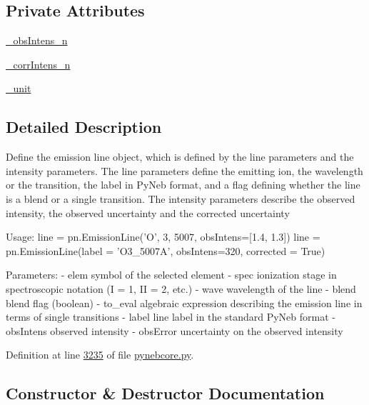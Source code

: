 \subsection*{Private Attributes}
\begin{DoxyCompactItemize}
\item 
\hyperlink{classpyneb_1_1core_1_1pynebcore_1_1_emission_line_a87753879f7fa6ac6a40e05bc0e5c3c72}{\+\_\+obs\+Intens\+\_\+n}
\item 
\hyperlink{classpyneb_1_1core_1_1pynebcore_1_1_emission_line_aa1f44ce8f6be439b590589c08da84fc2}{\+\_\+corr\+Intens\+\_\+n}
\item 
\hyperlink{classpyneb_1_1core_1_1pynebcore_1_1_emission_line_a1828e90dccac2948129b7052c54eedf5}{\+\_\+unit}
\end{DoxyCompactItemize}


\subsection{Detailed Description}
\begin{DoxyVerb}Define the emission line object, which is defined by the line parameters and the intensity 
    parameters.
The line parameters define the emitting ion, the wavelength or the transition, the label 
    in PyNeb format, and a flag defining whether the line is a blend or a single transition. 
The intensity parameters describe the observed intensity, the observed uncertainty and 
    the corrected uncertainty
    
Usage:
    line = pn.EmissionLine('O', 3, 5007, obsIntens=[1.4, 1.3])
    line = pn.EmissionLine(label = 'O3_5007A', obsIntens=320, corrected = True)

Parameters:
    - elem        symbol of the selected element
    - spec        ionization stage in spectroscopic notation (I = 1, II = 2, etc.)
    - wave        wavelength of the line
    - blend       blend flag (boolean)
    - to_eval     algebraic expression describing the emission line in terms of single transitions
    - label       line label in the standard PyNeb format
    - obsIntens   observed intensity
    - obsError    uncertainty on the observed intensity\end{DoxyVerb}
 

Definition at line \hyperlink{pynebcore_8py_source_l03235}{3235} of file \hyperlink{pynebcore_8py_source}{pynebcore.\+py}.



\subsection{Constructor \& Destructor Documentation}
\hypertarget{classpyneb_1_1core_1_1pynebcore_1_1_emission_line_a4966db926181349d90594f0b6d170c45}{}
